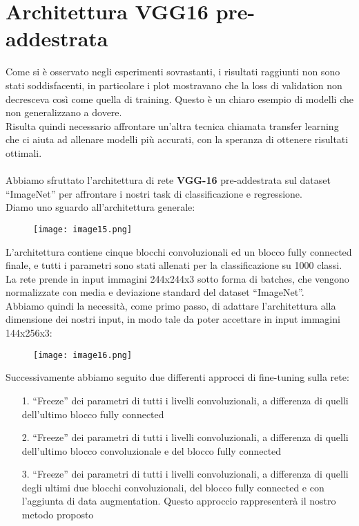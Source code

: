 \section{Architettura VGG16 pre-addestrata}
Come si è osservato negli esperimenti sovrastanti, i risultati raggiunti non sono stati soddisfacenti, in particolare i plot mostravano che la loss di validation non decresceva così come quella di training. Questo è un chiaro esempio di modelli che non generalizzano a dovere. \\
Risulta quindi necessario affrontare un’altra tecnica chiamata transfer learning che ci aiuta ad allenare modelli più accurati, con la speranza di ottenere risultati ottimali.
\\ \\
Abbiamo sfruttato l’architettura di rete {\bf VGG-16} pre-addestrata sul dataset “ImageNet” per affrontare i nostri task di classificazione e regressione.\\
Diamo uno sguardo all’architettura generale:
\begin{figure}[H]
	\centering
	\texttt{[image: image15.png]}
\end{figure}
L’architettura contiene cinque blocchi convoluzionali ed un blocco fully connected finale, e tutti i parametri sono stati allenati per la classificazione su 1000 classi. \\
La rete prende in input immagini 244x244x3 sotto forma di batches, che vengono normalizzate con media e deviazione standard del dataset “ImageNet”. \\
Abbiamo quindi la necessità, come primo passo, di adattare l’architettura alla dimensione dei nostri input, in modo tale da poter accettare in input immagini 144x256x3:
\begin{figure}[H]
	\centering
	\texttt{[image: image16.png]}
\end{figure}
Successivamente abbiamo seguito due differenti approcci di fine-tuning sulla rete:
\begin{itemize}
	\item[1.]“Freeze” dei parametri di tutti i livelli convoluzionali, a differenza di quelli dell’ultimo blocco fully connected
	\item[2.]“Freeze” dei parametri di tutti i livelli convoluzionali, a differenza di quelli dell’ultimo blocco convoluzionale e del blocco fully connected
	\item[3.]“Freeze” dei parametri di tutti i livelli convoluzionali, a differenza di quelli degli ultimi due blocchi convoluzionali, del blocco fully connected e con l’aggiunta di data augmentation. Questo approccio rappresenterà il nostro metodo proposto
\end{itemize}

